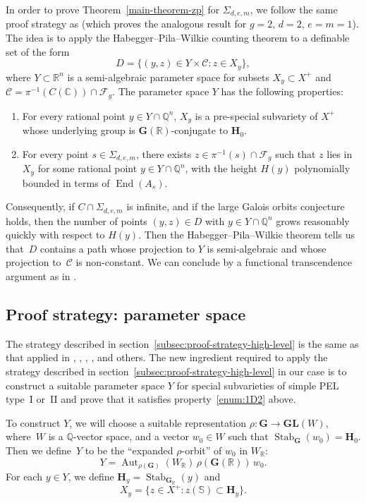 \documentclass[JEP,XML,SOM,Unicode,NoFloatCountersInSection]{cedram}
\newcommand{\bC}{\mathbb{C}}
\newcommand{\bQ}{\mathbb{Q}}
\newcommand{\bR}{\mathbb{R}}
\newcommand{\bS}{\mathbb{S}}
\newcommand{\cC}{\mathcal{C}}
\newcommand{\Fg}{\mathcal{F}_g}
\newcommand{\gG}{\mathbf{G}}
\newcommand{\gGL}{\mathbf{GL}}
\newcommand{\gH}{\mathbf{H}}
\DeclareMathOperator{\Aut}{Aut}
\DeclareMathOperator{\End}{End}
\DeclareMathOperator{\Stab}{Stab}
\begin{document}
In order to prove Theorem~\ref{main-theorem-zp} for $\Sigma_{d,e,m}$, we follow the same proof strategy as \cite{QRTUI} (which proves the analogous result for $g=2$, $d=2$, $e=m=1$).
The idea is to apply the Habegger--Pila--Wilkie counting theorem \cite[Cor.\,7.2]{HP16} to a definable set of the form
\[
D = \{ (y,z) \in Y \times \cC : z \in X_y \},
\]
where $Y \subset \bR^n$ is a semi-algebraic parameter space for subsets $X_y \subset X^+$ and $\cC = \pi^{-1}(C(\bC)) \cap \Fg$.
The parameter space $Y$ has the following properties:
\begin{enumerate}
\item\label{enum:1D1} For every rational point $y \in Y \cap \bQ^n$, $X_y$ is a pre-special subvariety of $X^+$ whose underlying group is $\gG(\bR)$-conjugate to $\gH_0$.
\item\label{enum:1D2} For every point $s \in \Sigma_{d,e,m}$, there exists $z \in \pi^{-1}(s) \cap \Fg$ such that $z$ lies in $X_y$ for some rational point $y \in Y \cap \bQ^n$, with the height $H(y)$ polynomially bounded in terms of $\End(A_s)$.
\end{enumerate}

Consequently, if $C \cap \Sigma_{d,e,m}$ is infinite, and if the large Galois orbits conjecture holds, then the number of points $(y,z) \in D$ with $y \in Y \cap \bQ^n$ grows reasonably quickly with respect to $H(y)$.
Then the Habegger--Pila--Wilkie theorem tells us that~$D$ contains a path whose projection to $Y$ is semi-algebraic and whose projection to~$\cC$ is non-constant.
We can conclude by a functional transcendence argument as in \cite[\S6.5]{QRTUI}.

\subsection{Proof strategy: parameter space} \label{subsec:parameter-space}

The strategy described in section~\ref{subsec:proof-strategy-high-level} is the same as that applied in \cite{HP16}, \cite{DR18}, \cite{ExCM}, \cite{QRTUI}, and others. The new ingredient required to apply the strategy described in section~\ref{subsec:proof-strategy-high-level} in our case is to construct a suitable parameter space $Y$ for special subvarieties of simple PEL type~I or~II and prove that it satisfies property~\eqref{enum:1D2} above.

To construct $Y$, we will choose a suitable representation $\rho \colon \gG \to \gGL(W)$, where~$W$ is a $\bQ$-vector space, and a vector $w_0 \in W$ such that $\Stab_{\gG}(w_0) = \gH_0$.
Then we define~$Y$ to be the ``expanded $\rho$-orbit'' of $w_0$ in $W_\bR$:
\[
Y = \Aut_{\rho(\gG)}(W_\bR) \, \rho(\gG(\bR)) \, w_0.
\]
For each $y \in Y$, we define $\gH_y = \Stab_{\gG_\bR}(y)$ and
\[
X_y = \{ z \in X^+ : z(\bS) \subset \gH_y \}.
\]
\end{document}
